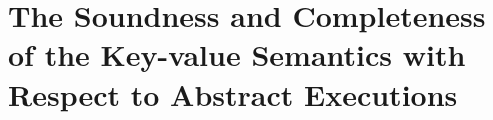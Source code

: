 \section{The Soundness and Completeness of the Key-value Semantics with Respect to Abstract Executions}
\label{sec:kv-sound-complete-proof}



